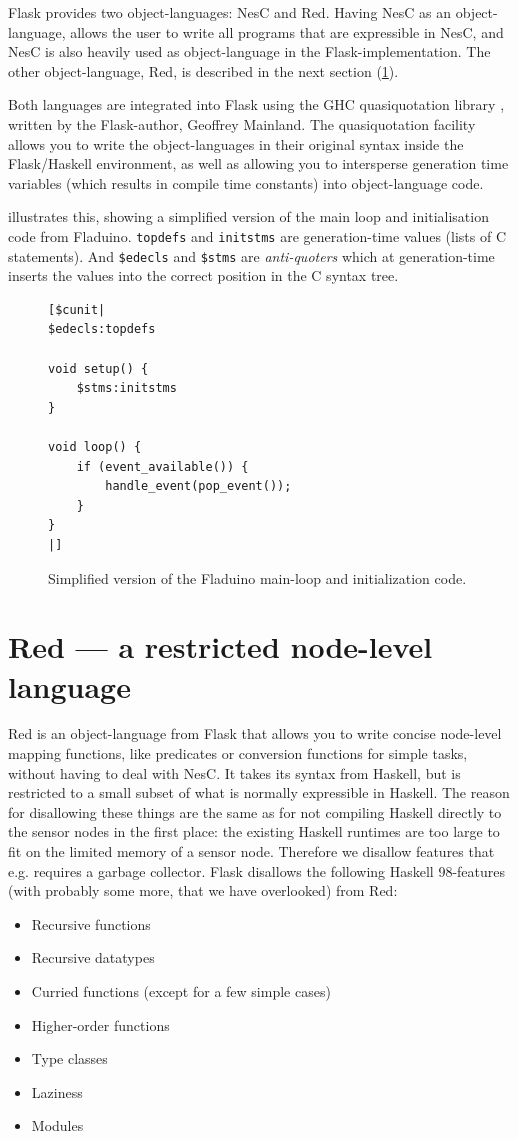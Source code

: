 \documentclass[a4paper, oneside, final]{memoir}
\let\Fref\undefined
\begin{document}
Flask provides two object-languages: NesC and Red. Having NesC as an
object-language, allows the user to write all programs that are
expressible in NesC, and NesC is also heavily used as object-language
in the Flask-implementation. The other object-language, Red, is
described in the next section (\ref{sec:red}).

Both languages are integrated into Flask using the GHC quasiquotation
library \cite{quasiquote07}, written by the Flask-author, Geoffrey
Mainland. The quasiquotation facility allows you to write the
object-languages in their original syntax inside the Flask/Haskell
environment, as well as allowing you to intersperse generation time
variables (which results in compile time constants) into
object-language code.

\Fref{fig:mainloop} illustrates this, showing a simplified
version of the main loop and initialisation code from Fladuino.
\texttt{topdefs} and \texttt{initstms} are generation-time values
(lists of C statements). And \texttt{\$edecls} and \texttt{\$stms} are
\textit{anti-quoters} which at generation-time inserts the values into
the correct position in the C syntax tree.

\begin{figure}
\begin{verbatim}
[$cunit|
$edecls:topdefs

void setup() {
    $stms:initstms
}

void loop() {
    if (event_available()) {
        handle_event(pop_event());
    }
}
|]
\end{verbatim}
\caption{Simplified version of the Fladuino main-loop and
  initialization code.}
\label{fig:mainloop}
\end{figure}

\section{Red --- a restricted node-level language}
\label{sec:red}
Red is an object-language from Flask that allows you to write concise
node-level mapping functions, like predicates or conversion functions
for simple tasks, without having to deal with NesC. It takes its
syntax from Haskell, but is restricted to a small subset of what is
normally expressible in Haskell. The reason for disallowing these
things are the same as for not compiling Haskell directly to the
sensor nodes in the first place: the existing Haskell runtimes are too
large to fit on the limited memory of a sensor node. Therefore we
disallow features that e.g.  requires a garbage collector. Flask
disallows the following Haskell 98-features (with probably some more,
that we have overlooked) from Red:
\begin{itemize}
\item Recursive functions
\item Recursive datatypes
\item Curried functions (except for a few simple cases)
\item Higher-order functions
\item Type classes
\item Laziness
\item Modules
\end{itemize}
\end{document}
